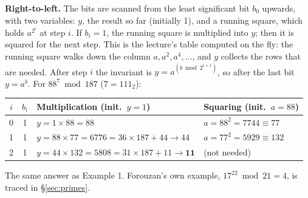 \textbf{Right-to-left.} The bits are scanned from the least significant bit $b_0$ upwards, with two variables: $y$, the result so far (initially 1), and a running square, which holds $a^{2^i}$ at step $i$. If $b_i = 1$, the running square is multiplied into $y$; then it is squared for the next step. This is the lecture's table computed on the fly: the running square walks down the column $a, a^2, a^4, \dots$, and $y$ collects the rows that are needed. After step $i$ the invariant is $y = a^{(b \bmod 2^{i+1})}$, so after the last bit $y = a^b$. For $88^7 \bmod 187$ ($7 = 111_2$):
\begin{center}\small
\begin{tabular}{@{}ccll@{}}
\toprule
$i$ & $b_i$ & Multiplication (init.\ $y = 1$) & Squaring (init.\ $a = 88$)\\
\midrule
0 & 1 & $y = 1 \times 88 = 88$ & $a = 88^2 = 7744 \equiv 77$\\
1 & 1 & $y = 88 \times 77 = 6776 = 36 \times 187 + 44 \to 44$ & $a = 77^2 = 5929 \equiv 132$\\
2 & 1 & $y = 44 \times 132 = 5808 = 31 \times 187 + 11 \to \mathbf{11}$ & (not needed)\\
\bottomrule
\end{tabular}
\end{center}
The same answer as Example 1. Forouzan's own example, $17^{22} \bmod 21 = 4$, is traced in \S\ref{sec:primes}.

